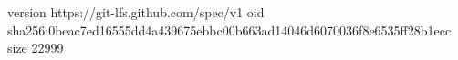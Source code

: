 version https://git-lfs.github.com/spec/v1
oid sha256:0beac7ed16555dd4a439675ebbc00b663ad14046d6070036f8e6535ff28b1ecc
size 22999
